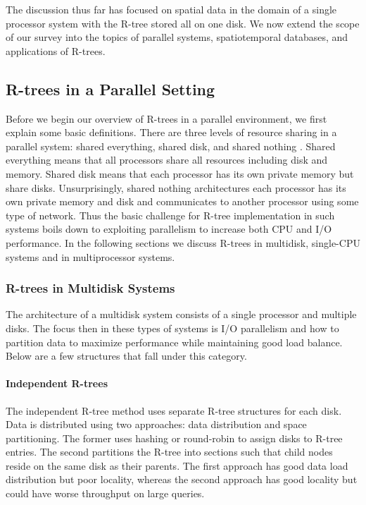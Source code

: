 The discussion thus far has focused on spatial data in the domain of a single
processor system with the R-tree stored all on one disk. We now extend the 
scope of our survey into the topics of parallel systems, 
spatiotemporal databases, and applications of R-trees.

\subsection{R-trees in a Parallel Setting}
Before we begin our overview of R-trees in a parallel environment, we first 
explain some basic definitions. There are three levels of resource sharing in
a parallel system: shared everything, shared disk, and shared nothing
\cite{thebook}. Shared everything means that all processors share all 
resources including disk and memory. Shared disk means that each processor 
has its own private memory but share disks. Unsurprisingly, shared nothing 
architectures each processor has its own private memory and disk and 
communicates to another processor using some type of network. 
Thus the basic challenge for R-tree 
implementation in such systems boils down to exploiting parallelism to 
increase both CPU and I/O performance. In the following sections we discuss
R-trees in multidisk, single-CPU systems and in multiprocessor systems.

\subsubsection{R-trees in Multidisk Systems}
The architecture of a multidisk system consists of a single processor and 
multiple disks. The focus then in these types of systems is I/O parallelism
and how to partition data to maximize performance while maintaining good load
balance. Below are a few structures that fall under this category.

\paragraph{Independent R-trees}
The independent R-tree method \cite{kamel1992parallel, thebook} uses separate 
R-tree structures for each disk.
Data is distributed using two approaches: data distribution and space 
partitioning. The former uses hashing or round-robin to assign disks to
R-tree entries. The second partitions the R-tree into sections such that 
child nodes reside on the same disk as their parents. The first approach 
has good data load distribution but poor locality, whereas the second approach
has good locality but could have worse throughput on large queries.

